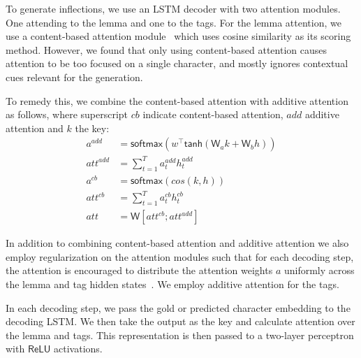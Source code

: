 \documentclass[11pt,a4paper]{article}
\newcommand\jp[1]{\textbf{JP: #1}}
\begin{document}
To generate inflections, we use an LSTM decoder with two attention
modules. One attending to the lemma and one to the tags. For the lemma
attention, we use a content-based attention
module~\cite{graves2014neural, karunaratne2021robust} which uses
cosine similarity as its scoring method.  However, we found that only
using content-based attention causes attention to be too focused on a
single character, and mostly ignores contextual cues relevant for the
generation.

To remedy this, we combine the content-based attention with additive
attention as follows, where superscript $cb$ indicate content-based attention,
$add$ additive attention and $k$ the key:
%
\begin{align*}
	a^{add} & = \mathsf{softmax}(w^\top\mathsf{tanh}(\mathsf{W}_ak + \mathsf{W}_bh))\\
	att^{add} & = \sum_{t=1}^{T}a_t^{add}h_t^{add}\\
	a^{cb} & = \mathsf{softmax}(cos(k,h))\\
	att^{cb} & = \sum_{t=1}^{T}a_t^{cb}h_t^{cb}\\
	att & = \mathsf{W}[att^{cb}; att^{add}]
\end{align*}

In addition to combining content-based attention and additive
attention we also employ regularization on the attention modules such
that for each decoding step, the attention is encouraged to distribute
the attention weights $a$ uniformly across the lemma and tag hidden
states~\cite{DBLP:conf/emnlp/AnastasopoulosN19,
DBLP:conf/naacl/CohnHVYDH16}. We employ additive attention for the tags.

In each decoding step, we pass the gold or predicted character embedding
to the decoding LSTM. We then take the output as the key and calculate
attention over the lemma and tags. This representation is then passed
to a two-layer perceptron with $\mathsf{ReLU}$ activations.

\end{document}
